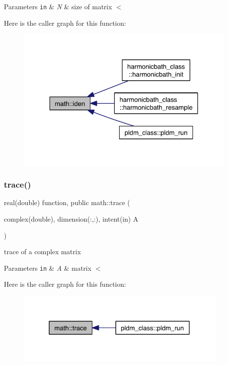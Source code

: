 \begin{DoxyParams}[1]{Parameters}
\mbox{\tt in}  & {\em N} & size of matrix $<$ \\
\hline
\end{DoxyParams}
Here is the caller graph for this function\+:\nopagebreak
\begin{figure}[H]
\begin{center}
\leavevmode
\includegraphics[width=310pt]{namespacemath_a43efec08acf55747fa1e14085858aade_icgraph}
\end{center}
\end{figure}
\mbox{\label{namespacemath_a9f8f22c01066f03fe5900edb63b56c89}} 
\subsubsection{\texorpdfstring{trace()}{trace()}}
{\footnotesize\ttfamily real(double) function, public math\+::trace (\begin{DoxyParamCaption}\item[{complex(double), dimension(\+:,\+:), intent(in)}]{A }\end{DoxyParamCaption})}



trace of a complex matrix 


\begin{DoxyParams}[1]{Parameters}
\mbox{\tt in}  & {\em A} & matrix $<$ \\
\hline
\end{DoxyParams}
Here is the caller graph for this function\+:\nopagebreak
\begin{figure}[H]
\begin{center}
\leavevmode
\includegraphics[width=296pt]{namespacemath_a9f8f22c01066f03fe5900edb63b56c89_icgraph}
\end{center}
\end{figure}


